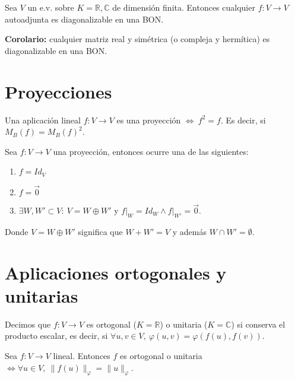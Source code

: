 \documentclass[14pt]{book}
\begin{document}
\begin{tm}
	Sea $V$ un e.v. sobre $K = \mathbb{R, C}$ de dimensión finita. Entonces cualquier $f:V \to V$ autoadjunta es diagonalizable en una BON.
	
	\textbf{Corolario:} cualquier matriz real y simétrica (o compleja y hermítica) es diagonalizable en una BON.
\end{tm}

\section{Proyecciones}

\begin{dfn}[Proyección]
	Una aplicación lineal $f: V \to V$ es una proyección $\iff \ f^2 = f$. Es decir, si $M_B(f) = M_B(f)^2$.
\end{dfn}

\begin{pro}
	Sea $f:V \to V$ una proyección, entonces ocurre una de las siguientes:
	\begin{enumerate}
		\item $f = Id_V$
		\item $f = \overrightarrow{0}$
		\item $\exists W, W' \subset V : \ V = W \oplus W'$ y $f\vert_W = Id_W \land f\vert_{W'} = \overrightarrow{0}$.
	\end{enumerate}
	Donde $V = W \oplus W'$ significa que $W + W' = V$ y además $W \cap W' = \emptyset$.
\end{pro}

\section{Aplicaciones ortogonales y unitarias}
\begin{dfn}
	Decimos que $f: V \to V$ es ortogonal ($K = \mathbb{R}$) o unitaria ($K = \mathbb{C}$) si conserva el producto escalar, es decir, si $\forall u,v \in V,\ \varphi(u, v) = \varphi(f(u), f(v))$.
\end{dfn}

\begin{tm}
	Sea $f: V \to V$ lineal. Entonces $f$ es ortogonal o unitaria $\iff \forall u \in V, \ \lVert f(u)\rVert_\varphi = \lVert u \rVert_\varphi$.
\end{tm}
\end{document}
